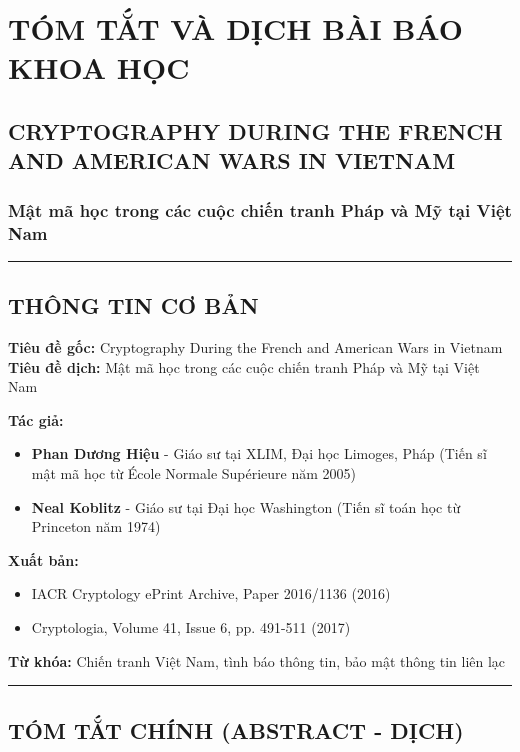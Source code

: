 \section{TÓM TẮT VÀ DỊCH BÀI BÁO KHOA HỌC}
\subsection{CRYPTOGRAPHY DURING THE FRENCH AND AMERICAN WARS IN VIETNAM}
\subsubsection{Mật mã học trong các cuộc chiến tranh Pháp và Mỹ tại Việt Nam}

\vspace{0.5cm}
\rule{\textwidth}{1pt}
\vspace{0.5cm}

\subsection{THÔNG TIN CƠ BẢN}

\textbf{Tiêu đề gốc:} Cryptography During the French and American Wars in Vietnam\\
\textbf{Tiêu đề dịch:} Mật mã học trong các cuộc chiến tranh Pháp và Mỹ tại Việt Nam

\textbf{Tác giả:}
\begin{itemize}
\item \textbf{Phan Dương Hiệu} - Giáo sư tại XLIM, Đại học Limoges, Pháp (Tiến sĩ mật mã học từ École Normale Supérieure năm 2005)
\item \textbf{Neal Koblitz} - Giáo sư tại Đại học Washington (Tiến sĩ toán học từ Princeton năm 1974)
\end{itemize}

\textbf{Xuất bản:}
\begin{itemize}
\item IACR Cryptology ePrint Archive, Paper 2016/1136 (2016)
\item Cryptologia, Volume 41, Issue 6, pp. 491-511 (2017)
\end{itemize}

\textbf{Từ khóa:} Chiến tranh Việt Nam, tình báo thông tin, bảo mật thông tin liên lạc

\vspace{0.5cm}
\rule{\textwidth}{1pt}
\vspace{0.5cm}

\subsection{TÓM TẮT CHÍNH (ABSTRACT - DỊCH)}

